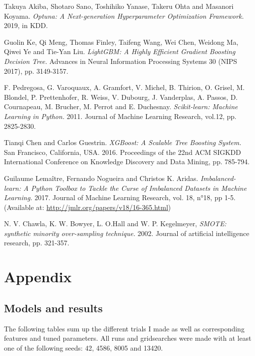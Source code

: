 \documentclass{article}
\begin{document}
\begin{multicols}{2}
\begin{thebibliography}{9}
Takuya Akiba, Shotaro Sano, Toshihiko Yanase, Takeru Ohta and Masanori Koyama.
\textit{Optuna: A Next-generation Hyperparameter Optimization Framework.} 2019, in KDD.

Guolin Ke, Qi Meng, Thomas Finley, Taifeng Wang, Wei Chen, Weidong Ma, Qiwei Ye and Tie-Yan Liu.
\textit{LightGBM: A Highly Efficient Gradient Boosting Decision Tree.} Advances in Neural
Information Processing Systems 30 (NIPS 2017), pp. 3149-3157.

F. Pedregosa, G. Varoquaux, A. Gramfort, V. Michel, B. Thirion, O. Grisel, M. Blondel,
P. Prettenhofer, R. Weiss, V. Dubourg, J. Vanderplas, A. Passos, D. Cournapeau, M. Brucher,
M. Perrot and E. Duchesnay. \textit{Scikit-learn: Machine Learning in Python.} 2011. Journal
of Machine Learning Research, vol.12, pp. 2825-2830.

Tianqi Chen and Carlos Guestrin. \textit{XGBoost: A Scalable Tree Boosting System.}
San Francisco, California, USA. 2016. Proceedings of the 22nd ACM SIGKDD International
Conference on Knowledge Discovery and Data Mining, pp. 785-794.

Guilaume Lemaître, Fernando Nogueira and Christos K. Aridas. \textit{Imbalanced-learn: A
Python Toolbox to Tackle the Curse of Imbalanced Datasets in Machine Learning.} 2017.
Journal of Machine Learning Research, vol. 18, n°18, pp 1-5. (Available at:
\url{http://jmlr.org/papers/v18/16-365.html})

N. V. Chawla, K. W. Bowyer, L. O.Hall and W. P. Kegelmeyer, \textit{SMOTE: synthetic minority
over-sampling technique.} 2002. Journal of artificial intelligence research, pp. 321-357.

\end{thebibliography}

\end{multicols}

\newpage

\section*{Appendix}

\subsection*{Models and results}

The following tables sum up the different trials I made as well as corresponding
features and tuned parameters. All runs and gridsearches were made with at least one of
the following
seeds: 42, 4586, 8005 and 13420.
\end{document}
